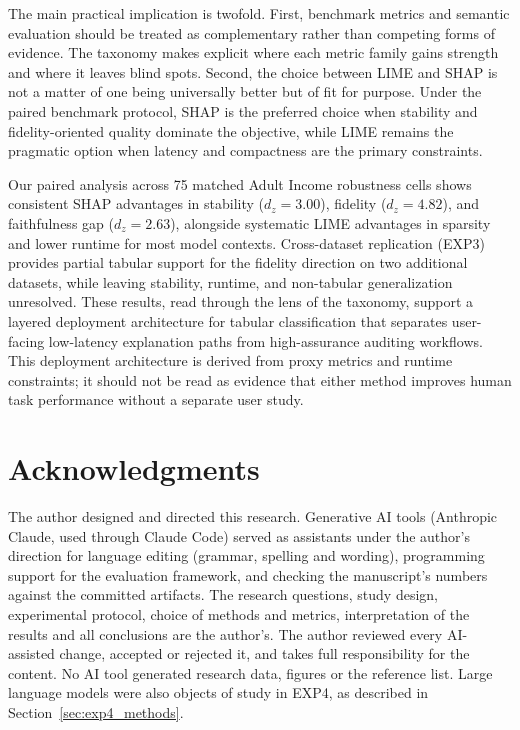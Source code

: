 \documentclass[fleqn,10pt,lineno]{wlpeerj}
\begin{document}
The main practical implication is twofold. First, benchmark metrics and
semantic evaluation should be treated as complementary rather than
competing forms of evidence. The taxonomy makes explicit where each
metric family gains strength and where it leaves blind spots. Second, the
choice between LIME and SHAP is not a matter of one being universally
better but of fit for purpose. Under the paired benchmark protocol, SHAP
is the preferred choice when stability and fidelity-oriented quality
dominate the objective, while LIME remains the pragmatic option when
latency and compactness are the primary constraints.

Our paired analysis across 75 matched Adult Income robustness cells shows
consistent SHAP advantages in stability ($d_z = 3.00$), fidelity
($d_z = 4.82$), and faithfulness gap ($d_z = 2.63$), alongside systematic
LIME advantages in sparsity and lower runtime for most model contexts.
Cross-dataset replication (EXP3) provides partial tabular support for the
fidelity direction on two additional datasets, while leaving stability,
runtime, and non-tabular generalization unresolved. These results, read
through the lens of the taxonomy, support a layered deployment
architecture for tabular classification that separates user-facing
low-latency explanation paths from high-assurance auditing workflows. This
deployment architecture is derived from proxy metrics and runtime
constraints; it should not be read as evidence that either method improves
human task performance without a separate user study.

\section*{Acknowledgments}

The author designed and directed this research. Generative AI tools
(Anthropic Claude, used through Claude Code) served as assistants under the
author's direction for language editing (grammar, spelling and wording),
programming support for the evaluation framework, and checking the
manuscript's numbers against the committed artifacts. The research
questions, study design, experimental protocol, choice of methods and
metrics, interpretation of the results and all conclusions are the
author's. The author reviewed every AI-assisted change, accepted or rejected
it, and takes full responsibility for the content. No AI tool generated
research data, figures or the reference list. Large language models were also
objects of study in EXP4, as described in Section~\ref{sec:exp4_methods}.
\end{document}
